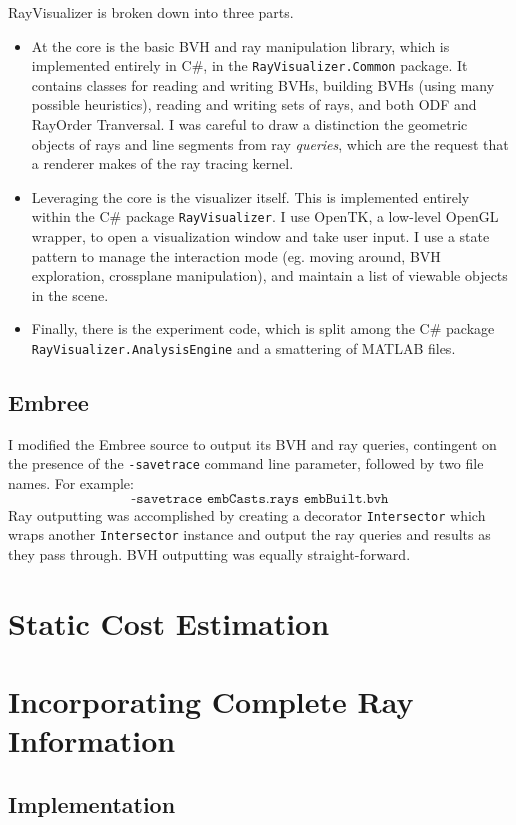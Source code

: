 \documentclass[twocolumn]{article}
\begin{document}
RayVisualizer is broken down into three parts.  
\begin{itemize}
\item At the core is the basic BVH and ray manipulation library, which is implemented entirely in C\#, in the {\tt RayVisualizer.Common} package.  It contains classes for reading and writing BVHs, building BVHs (using many possible heuristics), reading and writing sets of rays, and both ODF and RayOrder Tranversal.  I was careful to draw a distinction the geometric objects of rays and line segments from ray {\em queries}, which are the request that a renderer makes of the ray tracing kernel. 
\item Leveraging the core is the visualizer itself.  This is implemented entirely within the C\# package {\tt RayVisualizer}.  I use OpenTK, a low-level OpenGL wrapper, to open a visualization window and take user input.  I use a state pattern to manage the interaction mode (eg. moving around, BVH exploration, crossplane manipulation), and maintain a list of viewable objects in the scene.  
\item Finally, there is the experiment code, which is split among the C\# package {\tt RayVisualizer.AnalysisEngine} and a smattering of MATLAB files.
\end{itemize}

\subsection{Embree}

I modified the Embree source to output its BVH and ray queries, contingent on the presence of the {\tt -savetrace} command line parameter, followed by two file names.  For example:
\[\texttt{-savetrace embCasts.rays embBuilt.bvh}\]
Ray outputting was accomplished by creating a decorator {\tt Intersector} which wraps another {\tt Intersector} instance and output the ray queries and results as they pass through.  BVH outputting was equally straight-forward.

\section{Static Cost Estimation}

\section{Incorporating Complete Ray Information}
\subsection{Implementation}
\end{document}
